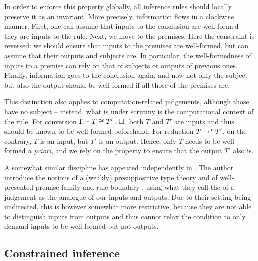 In order to enforce this property globally, all inference rules should locally
preserve it as an invariant.%
More precisely, information flows in a clockwise manner. First, one can assume that inputs
to the conclusion are well-formed – they are inputs to the rule. Next, we move to the
premises. Here the constraint is reversed: we should ensure that inputs to the premises are
well-formed, but can assume that their outputs and subjects are. In particular,
the well-formedness of inputs to a premise can rely on that of subjects or outputs
of previous ones.
Finally, information goes to the conclusion again, and now not only the subject but also
the output should be well-formed if all those of the premises are.

This distinction also applies to computation-related judgements, although those have no subject – instead, what is under scrutiny is the computational context of the rule.
For conversion $\Gamma \vdash T \conv T' : \uni$, 
both $T$ and $T'$ are inputs and thus should be known to be well-formed beforehand.
For reduction $T \rightarrow^{\star} T'$, on the contrary, $T$ is an input,
but $T'$ is an output. Hence, only $T$ needs to be well-formed \textit{a priori},
and we rely on the  property to ensure
that the output $T'$ also is.

A somewhat similar discipline has appeared independently in .
The author introduce the notions of a (weakly) presuppositive type theory
\cite[Def.~5.6]{Bauer2020} and of well-presented premise-family and rule-boundary
\cite[Def.~6.16 and 6.17]{Bauer2020}, using what they call the  of a judgement
as the analogue of our inputs and outputs.
Due to their setting being undirected, this is however somewhat more restrictive,
because they are not able to distinguish inputs from outputs and thus cannot relax the
condition to only demand inputs to be well-formed but not outputs.

\subsection{Constrained inference}

